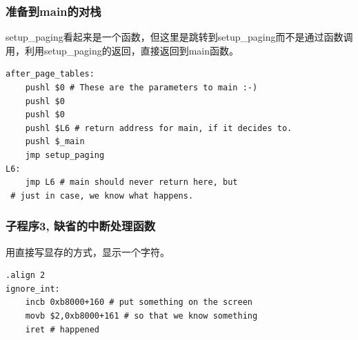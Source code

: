 \documentclass[12pt]{article}
\begin{document}
\subsubsection{准备到main的对栈}	
setup\_paging看起来是一个函数，但这里是跳转到setup\_paging而不是通过函数调用，利用setup\_paging的返回，直接返回到main函数。
\begin{lstlisting}[breaklines]
after_page_tables:
	pushl $0 # These are the parameters to main :-)
	pushl $0
	pushl $0
	pushl $L6 # return address for main, if it decides to.
	pushl $_main
	jmp setup_paging
L6:
	jmp L6 # main should never return here, but
 # just in case, we know what happens.
\end{lstlisting}
\subsubsection{子程序3, 缺省的中断处理函数}	
用直接写显存的方式，显示一个字符。
\begin{lstlisting}[breaklines]
.align 2
ignore_int:
	incb 0xb8000+160 # put something on the screen
	movb $2,0xb8000+161	# so that we know something
	iret # happened
\end{lstlisting}
\end{document}
